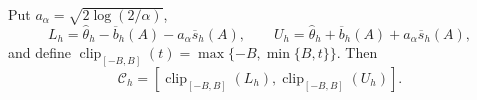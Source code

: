 Put \(a_\alpha=\sqrt{2\log(2/\alpha)}\),
\[
 L_h=\widehat\theta_h-\overline b_h(A)-a_\alpha\overline s_h(A),
 \qquad
 U_h=\widehat\theta_h+\overline b_h(A)+a_\alpha\overline s_h(A),
\]
and define \(\operatorname{clip}_{[-B,B]}(t)=\max\{-B,\min\{B,t\}\}\).  Then
\[
 \mathcal C_h=
 [\operatorname{clip}_{[-B,B]}(L_h),\operatorname{clip}_{[-B,B]}(U_h)].
\]